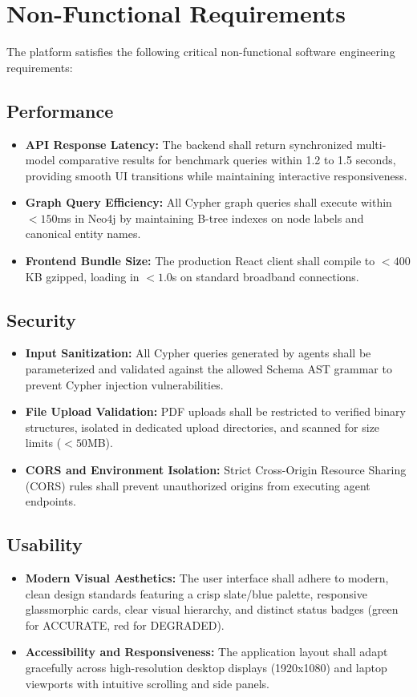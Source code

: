 \documentclass[12pt,a4paper,oneside]{report}
\begin{document}
\section{Non-Functional Requirements}
The platform satisfies the following critical non-functional software engineering requirements:

\subsection{Performance}
\begin{itemize}
    \item \textbf{API Response Latency:} The backend shall return synchronized multi-model comparative results for benchmark queries within 1.2 to 1.5 seconds, providing smooth UI transitions while maintaining interactive responsiveness.
    \item \textbf{Graph Query Efficiency:} All Cypher graph queries shall execute within $<150$ms in Neo4j by maintaining B-tree indexes on node labels and canonical entity names.
    \item \textbf{Frontend Bundle Size:} The production React client shall compile to $<400$KB gzipped, loading in $<1.0$s on standard broadband connections.
\end{itemize}

\subsection{Security}
\begin{itemize}
    \item \textbf{Input Sanitization:} All Cypher queries generated by agents shall be parameterized and validated against the allowed Schema AST grammar to prevent Cypher injection vulnerabilities.
    \item \textbf{File Upload Validation:} PDF uploads shall be restricted to verified binary structures, isolated in dedicated upload directories, and scanned for size limits ($<50$MB).
    \item \textbf{CORS and Environment Isolation:} Strict Cross-Origin Resource Sharing (CORS) rules shall prevent unauthorized origins from executing agent endpoints.
\end{itemize}

\subsection{Usability}
\begin{itemize}
    \item \textbf{Modern Visual Aesthetics:} The user interface shall adhere to modern, clean design standards featuring a crisp slate/blue palette, responsive glassmorphic cards, clear visual hierarchy, and distinct status badges (green for ACCURATE, red for DEGRADED).
    \item \textbf{Accessibility and Responsiveness:} The application layout shall adapt gracefully across high-resolution desktop displays (1920x1080) and laptop viewports with intuitive scrolling and side panels.
\end{itemize}
\end{document}
